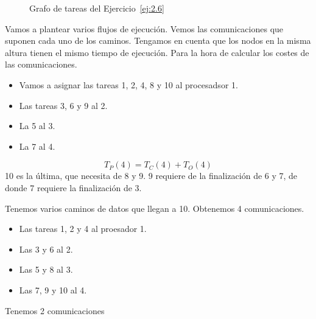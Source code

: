 \begin{ejercicio}
\begin{figure}
        \caption{Grafo de tareas del Ejercicio~\ref{ej:2.6}}
        \label{fig:Grafo_2.6}
    \end{figure}

    Vamos a plantear varios flujos de ejecución. %
    Vemos las comunicaciones que suponen cada uno de los caminos.
    Tengamos en cuenta que los nodos en la misma altura tienen el mismo tiempo de ejecución. Para la hora de calcular los costes de las comunicaciones.

    \begin{itemize}
        \item Vamos a asignar las tareas 1, 2, 4, 8 y 10 al procesadsor 1.
        \item Las tareas 3, 6 y 9 al 2.
        \item La 5 al 3.
        \item La 7 al 4.
    \end{itemize}

    \begin{equation*}
        T_P(4) = T_C(4) + T_O(4)
    \end{equation*}
    10 es la última, que necesita de 8 y 9. 9 requiere de la finalización de 6 y 7, de donde 7 requiere la finalización de 3.

    Tenemos varios caminos de datos que llegan a 10.
    Obtenemos 4 comunicaciones.

    \begin{itemize}
        \item Las tareas 1, 2 y 4 al proesador 1.
        \item Las 3 y 6 al 2.
        \item Las 5 y 8 al 3.
        \item Las 7, 9 y 10 al 4.
    \end{itemize}
    Tenemos 2 comunicaciones %
    

\end{ejercicio}

